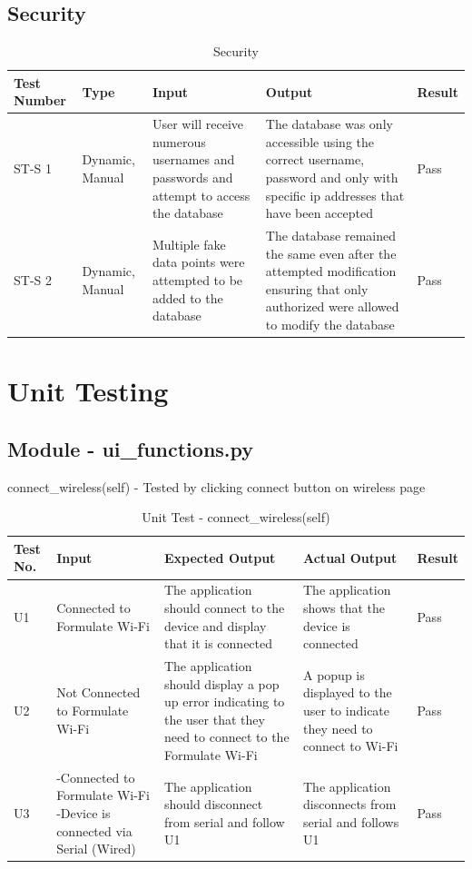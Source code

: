 \documentclass[12pt, titlepage]{article}
\begin{document}
\subsection{Security}
\begin{table}[H]
  \begin{tabular}{| p{} | p{}| p{}| p{}| p{}|}
    \hline
    \rowcolor[gray]{0.9}
    Test Number & Type & Input & Output & Result\\
    \hline
    ST-S 1 & Dynamic, Manual & User will receive numerous usernames and passwords and attempt to access the database & The database was only accessible using the correct username, password and only with specific ip addresses that have been accepted & Pass\\
    \hline
    ST-S 2 & Dynamic, Manual & Multiple fake data points were attempted to be added to the database & The database remained the same even after the attempted modification ensuring that only authorized were allowed to modify the database & Pass\\
    \hline
  \end{tabular}
  \caption{Security}
  \end{table}

\newpage
\section{Unit Testing}
\subsection{Module - ui\_functions.py}
connect\_wireless(self) - Tested by clicking connect button on wireless page
\begin{table}[H]
  \begin{tabular}{| p{} | p{}| p{}| p{}| p{}|}
    \hline
    \rowcolor[gray]{0.9}
    Test No. & Input & Expected Output & Actual Output & Result\\
    \hline
    U1 & Connected to Formulate Wi-Fi & The application should connect to the device and display that it is connected & The application shows that the device is connected & Pass \\
    \hline
    U2 & Not Connected to Formulate Wi-Fi  & The application should display a pop up error indicating to the user that they need to connect to the Formulate Wi-Fi & A popup is displayed to the user to indicate they need to connect to Wi-Fi & Pass \\
    \hline
    U3 & -Connected to Formulate Wi-Fi -Device is connected via Serial (Wired) & The application should disconnect from serial and follow U1 & The application disconnects from serial and follows U1 & Pass \\
    \hline
  \end{tabular}
  \caption{Unit Test - connect\_wireless(self)}
  \end{table}
\end{document}
